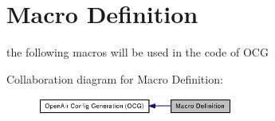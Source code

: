 \section{Macro Definition}
\label{group____useful__macro}
the following macros will be used in the code of OCG  




Collaboration diagram for Macro Definition:\nopagebreak
\begin{figure}[H]
\begin{center}
\leavevmode
\includegraphics[width=182pt]{group____useful__macro}
\end{center}
\end{figure}
